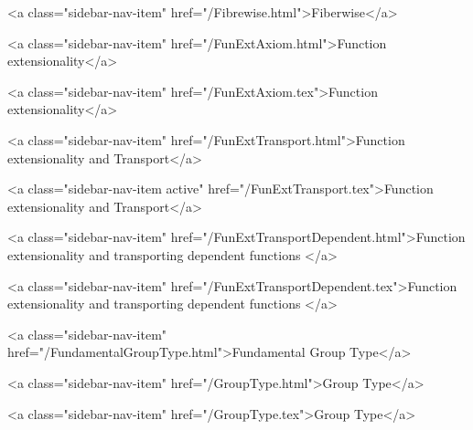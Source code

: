      
    
      
        
          <a class="sidebar-nav-item" href="/Fibrewise.html">Fiberwise</a>
        
      
    
      
        
          <a class="sidebar-nav-item" href="/FunExtAxiom.html">Function extensionality</a>
        
      
    
      
        
          <a class="sidebar-nav-item" href="/FunExtAxiom.tex">Function extensionality</a>
        
      
    
      
        
          <a class="sidebar-nav-item" href="/FunExtTransport.html">Function extensionality and Transport</a>
        
      
    
      
        
          <a class="sidebar-nav-item active" href="/FunExtTransport.tex">Function extensionality and Transport</a>
        
      
    
      
        
          <a class="sidebar-nav-item" href="/FunExtTransportDependent.html">Function extensionality and transporting dependent functions </a>
        
      
    
      
        
          <a class="sidebar-nav-item" href="/FunExtTransportDependent.tex">Function extensionality and transporting dependent functions </a>
        
      
    
      
        
          <a class="sidebar-nav-item" href="/FundamentalGroupType.html">Fundamental Group Type</a>
        
      
    
      
        
          <a class="sidebar-nav-item" href="/GroupType.html">Group Type</a>
        
      
    
      
        
          <a class="sidebar-nav-item" href="/GroupType.tex">Group Type</a>
        
      
    
